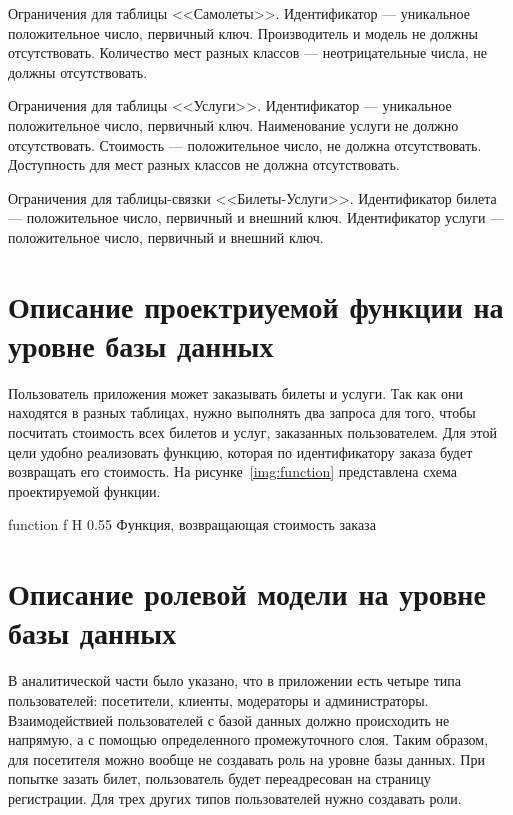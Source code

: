 \documentclass{bmstu}
\begin{document}
Ограничения для таблицы <<Самолеты>>. 
Идентификатор --- уникальное положительное число, первичный ключ. 
Производитель и модель не должны отсутствовать. 
Количество мест разных классов --- неотрицательные числа, не должны отсутствовать. 

Ограничения для таблицы <<Услуги>>. 
Идентификатор --- уникальное положительное число, первичный ключ. 
Наименование услуги не должно отсутствовать. 
Стоимость --- положительное число, не должна отсутствовать.
Доступность для мест разных классов не должна отсутствовать.

Ограничения для таблицы-связки <<Билеты-Услуги>>. 
Идентификатор билета --- положительное число, первичный и внешний ключ. 
Идентификатор услуги --- положительное число, первичный и внешний ключ. 

\pagebreak
\section{Описание проектриуемой функции на уровне базы данных}

Пользователь приложения может заказывать билеты и услуги. 
Так как они находятся в разных таблицах, нужно выполнять два запроса для того, чтобы посчитать стоимость всех билетов и услуг, заказанных пользователем. 
Для этой цели удобно реализовать функцию, которая по идентификатору заказа будет возвращать его стоимость. 
На рисунке~\ref{img:function} представлена схема проектируемой функции.

    {function}
    {f}
    {H}
    {0.55\textwidth}
    {Функция, возвращающая стоимость заказа}

\section{Описание ролевой модели на уровне базы данных}

В аналитической части было указано, что в приложении есть четыре типа пользователей: посетители, клиенты, модераторы и администраторы. 
Взаимодействией пользователей с базой данных должно происходить не напрямую, а с помощью определенного промежуточного слоя. 
Таким образом, для посетителя можно вообще не создавать роль на уровне базы данных. 
При попытке зазать билет, пользователь будет переадресован на страницу регистрации. 
Для трех других типов пользователей нужно создавать роли.
\end{document}
